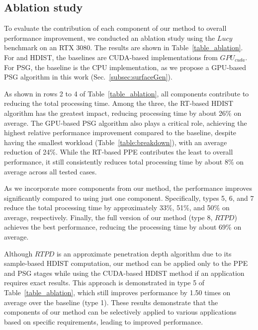 \subsection{Ablation study} 

To evaluate the contribution of each component of our method to overall performance improvement, we conducted an ablation study using the $Lucy$ benchmark on an RTX 3080.
The results are shown in Table~\ref{table_ablation}.
For  and HDIST, the baselines are CUDA-based implementations from $GPU_{cuda}$.
For PSG, the baseline is the CPU implementation, as we propose a GPU-based PSG algorithm in this work (Sec.~\ref{subsec:surfaceGen}).


As shown in rows 2 to 4 of Table~\ref{table_ablation}, all components contribute to reducing the total processing time.
Among the three, the RT-based HDIST algorithm has the greatest impact, reducing processing time by about 26\% on average.
The GPU-based PSG algorithm also plays a critical role, achieving the highest relative performance improvement compared to the baseline, despite having the smallest workload (Table~\ref{table:breakdown}), with an average reduction of 24\%.
While the RT-based PPE contributes the least to overall performance, it still consistently reduces total processing time by about 8\% on average across all tested cases.

As we incorporate more components from our method, the performance improves significantly compared to using just one component. Specifically, types 5, 6, and 7 reduce the total processing time by approximately 33\%, 51\%, and 50\% on average, respectively.
Finally, the full version of our method (type 8, $RTPD$) achieves the best performance, reducing the processing time by about 69\% on average.

Although $RTPD$ is an approximate penetration depth algorithm due to its sample-based HDIST computation, our method can be applied only to the PPE and PSG stages while using the CUDA-based HDIST method if an application requires exact results.
This approach is demonstrated in type 5 of Table~\ref{table_ablation}, which still improves performance by 1.50 times on average over the baseline (type 1).
These results demonstrate that the components of our method can be selectively applied to various applications based on specific requirements, leading to improved performance.

